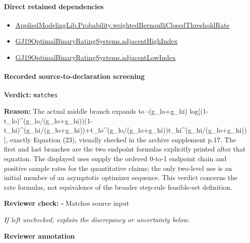\documentclass[10pt]{article}
\newcommand{\reviewerbox}{%
  \par\noindent\fbox{\parbox{0.96\linewidth}{\rule{0pt}{0.38in}}}\par
}
\newcommand{\reviewmatch}[1]{%
  \par\noindent\textbf{Reviewer check:} $\square$\; #1\par
  \noindent\emph{If left unchecked, explain the discrepancy or uncertainty below.}\par
}
\begin{document}
\paragraph{Direct retained dependencies}
\begin{itemize}\raggedright
\item \hyperlink{governing-declaration-40edb12d31a5e6d9}{Applied\allowbreak{}Modeling\allowbreak{}Lib.\allowbreak{}Probability.\allowbreak{}weighted\allowbreak{}Bernoulli\allowbreak{}Closed\allowbreak{}Threshold\allowbreak{}Rate}
\item \hyperlink{governing-declaration-28fccf34ba067e47}{GJ19\allowbreak{}Optimal\allowbreak{}Binary\allowbreak{}Rating\allowbreak{}Systems.\allowbreak{}adjacent\allowbreak{}High\allowbreak{}Index}
\item \hyperlink{governing-declaration-6d6631db7a243715}{GJ19\allowbreak{}Optimal\allowbreak{}Binary\allowbreak{}Rating\allowbreak{}Systems.\allowbreak{}adjacent\allowbreak{}Low\allowbreak{}Index}
\end{itemize}
\paragraph{Recorded source-to-declaration screening}
\textbf{Verdict:} \texttt{matches}
\\
{\raggedright
\textbf{Reason:} The actual middle branch expands to -\allowbreak{}(g\_\allowbreak{}lo+g\_\allowbreak{}hi) log[(1-\allowbreak{}t\_\allowbreak{}lo)\textasciicircum{}(g\_\allowbreak{}lo/\allowbreak{}(g\_\allowbreak{}lo+g\_\allowbreak{}hi))(1-\allowbreak{}t\_\allowbreak{}hi)\textasciicircum{}(g\_\allowbreak{}hi/\allowbreak{}(g\_\allowbreak{}lo+g\_\allowbreak{}hi))+t\_\allowbreak{}lo\textasciicircum{}(g\_\allowbreak{}lo/\allowbreak{}(g\_\allowbreak{}lo+g\_\allowbreak{}hi))t\_\allowbreak{}hi\textasciicircum{}(g\_\allowbreak{}hi/\allowbreak{}(g\_\allowbreak{}lo+g\_\allowbreak{}hi))], exactly Equation (23), visually checked in the archive supplement p.\allowbreak{}17.\allowbreak{} The first and last branches are the two endpoint formulas explicitly printed after that equation.\allowbreak{} The displayed uses supply the ordered 0-\allowbreak{}to-\allowbreak{}1 endpoint chain and positive sample rates for the quantitative claims;\allowbreak{} the only two-\allowbreak{}level use is an initial member of an asymptotic optimizer sequence.\allowbreak{} This verdict concerns the rate formulas, not equivalence of the broader step-\allowbreak{}rule feasible-\allowbreak{}set definition.\allowbreak{}
\par}
\reviewmatch{Matches source input}
\noindent\textbf{Reviewer annotation}\par
\reviewerbox
\clearpage
\hypertarget{paper-prerequisite-4c8033d6a0625382}{}
\end{document}
